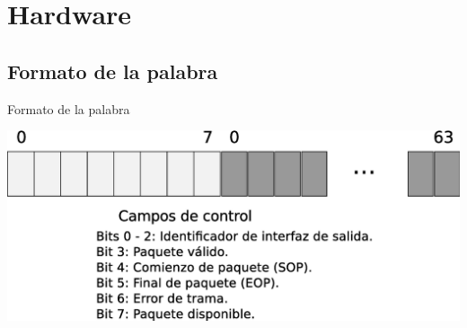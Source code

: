 \documentclass[xcolor=dvipsnames]{beamer}
\begin{document}

\section{Hardware}

\subsection{Formato de la palabra}
\begin{frame}{Formato de la palabra}

\center 
\includegraphics[scale=0.35]{figures/datocontrol.eps}

\end{frame}
\end{document}
